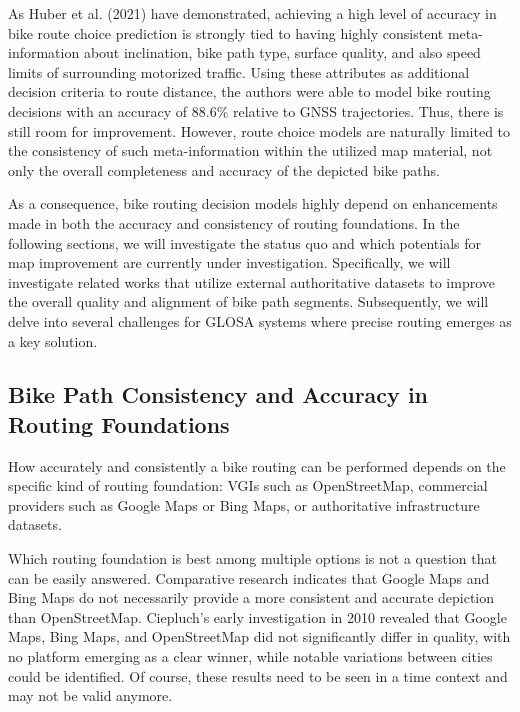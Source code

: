 As Huber et al. (2021) \cite{huber_modelling_2021} have demonstrated, achieving a high level of accuracy in bike route choice prediction is strongly tied to having highly consistent meta-information about inclination, bike path type, surface quality, and also speed limits of surrounding motorized traffic. Using these attributes as additional decision criteria to route distance, the authors were able to model bike routing decisions with an accuracy of 88.6\% relative to GNSS trajectories. Thus, there is still room for improvement. However, route choice models are naturally limited to the consistency of such meta-information within the utilized map material, not only the overall completeness and accuracy of the depicted bike paths.

As a consequence, bike routing decision models highly depend on enhancements made in both the accuracy and consistency of routing foundations. In the following sections, we will investigate the status quo and which potentials for map improvement are currently under investigation. Specifically, we will investigate related works that utilize external authoritative datasets to improve the overall quality and alignment of bike path segments. Subsequently, we will delve into several challenges for GLOSA systems where precise routing emerges as a key solution.

\subsection{Bike Path Consistency and Accuracy in Routing Foundations}

How accurately and consistently a bike routing can be performed depends on the specific kind of routing foundation: VGIs such as OpenStreetMap, commercial providers such as Google Maps or Bing Maps, or authoritative infrastructure datasets.

Which routing foundation is best among multiple options is not a question that can be easily answered. Comparative research indicates that Google Maps and Bing Maps do not necessarily provide a more consistent and accurate depiction than OpenStreetMap. Ciepluch's early investigation in 2010 \cite{ciepluch_comparison_2010} revealed that Google Maps, Bing Maps, and OpenStreetMap did not significantly differ in quality, with no platform emerging as a clear winner, while notable variations between cities could be identified. Of course, these results need to be seen in a time context and may not be valid anymore. 


